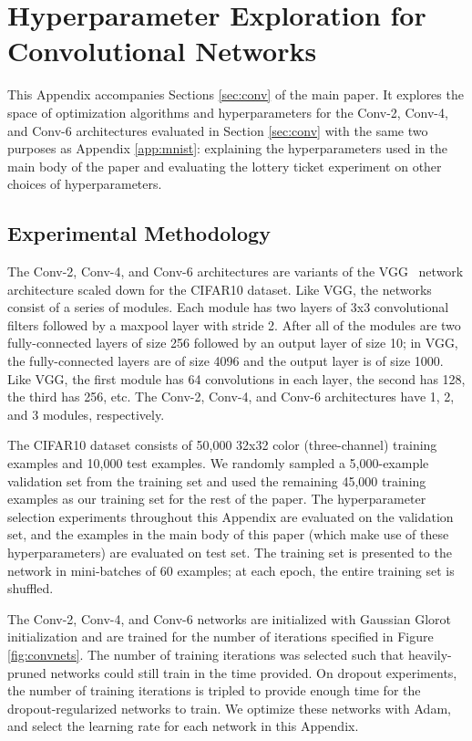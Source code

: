 \section{Hyperparameter Exploration for Convolutional Networks}
\label{app:conv}

This Appendix accompanies Sections \ref{sec:conv} of the main paper. It explores the space of optimization
algorithms and hyperparameters for the Conv-2, Conv-4, and Conv-6
architectures evaluated in Section \ref{sec:conv} with the same two purposes as Appendix \ref{app:mnist}: explaining the hyperparameters used
in the main body of the paper and evaluating the lottery ticket experiment on other choices of hyperparameters. 

\subsection{Experimental Methodology}

The Conv-2, Conv-4, and Conv-6 architectures are variants of the VGG~\citep{vgg} network architecture scaled down for the CIFAR10 \citep{cifar10} dataset.
Like VGG, the networks consist of a series of modules. Each module has two layers of 3x3 convolutional filters followed by a maxpool layer with stride 2.
After all of the modules are two fully-connected layers of size 256 followed by an output layer of size 10; in VGG, the fully-connected layers are of size 4096 and
the output layer is of size 1000. Like VGG, the first module has 64 convolutions in each layer, the second has 128, the third has 256, etc. The Conv-2, Conv-4, and Conv-6
architectures have 1, 2, and 3 modules, respectively.

The CIFAR10 dataset consists of 50,000 32x32 color (three-channel) training examples and 10,000 test examples. We randomly sampled a 5,000-example validation set from
the training set and used the remaining 45,000 training examples as our training set for the rest of the paper. The hyperparameter
 selection experiments throughout this Appendix are evaluated on the validation set, and the examples in the
main body of this paper (which make use of these hyperparameters) are evaluated on test set. The training set is presented to the network
in mini-batches of 60 examples; at each epoch, the entire training set is shuffled.

The Conv-2, Conv-4, and Conv-6 networks are initialized with Gaussian Glorot initialization \citep{xavier} and are trained for the number of iterations
specified in Figure \ref{fig:convnets}. The number of training iterations was selected such that heavily-pruned networks could still train in the
time provided. On dropout experiments, the number of training iterations is tripled to provide enough time for the dropout-regularized networks
to train. We optimize these networks with Adam, and select the learning rate for each network in this Appendix.

